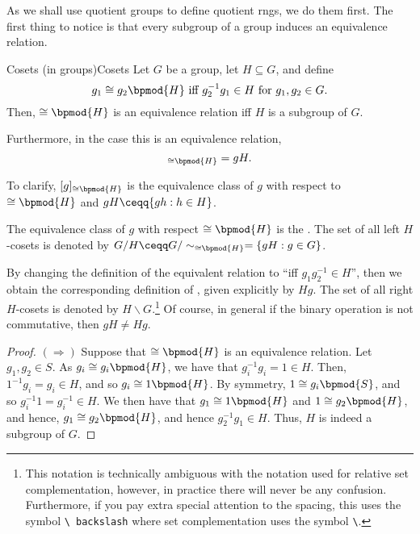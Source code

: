 As we shall use quotient groups to define quotient rngs, we do them first.  The first thing to notice is that every subgroup of a group induces an equivalence relation.
\begin{prp}{Cosets (in groups)}{Cosets}
Let $G$ be a group, let $H\subseteq G$, and define
\begin{equation}\label{eqnA.4.31}
g_1\cong g_2\bpmod{H}\text{ iff }g_2^{-1}g_1\in H\text{ for }g_1,g_2\in G.
\end{equation}
Then, $\cong \bpmod{H}$ is an equivalence relation iff $H$ is a subgroup of $G$.

Furthermore, in the case this is an equivalence relation,
\begin{equation}
[g]_{\cong \bpmod{H}}=gH.
\end{equation}
\begin{rmk}
To clarify, $[g]_{\cong \bpmod{H}}$ is the equivalence class of $g$ with respect to $\cong \bpmod{H}$ and $gH\ceqq \{ gh:h\in H\}$.
\end{rmk}
\begin{rmk}
The equivalence class of $g$ with respect $\cong \bpmod{H}$ is the .  The set of all left $H$-cosets is denoted by $G/H\ceqq G/\sim _{\cong \bpmod{H}}=\left\{ gH:g\in G\right\}$.
\end{rmk}
\begin{rmk}
By changing the definition of the equivalent relation to ``\textellipsis iff $g_1g_2^{-1}\in H$'', then we obtain the corresponding definition of , given explicitly by $Hg$.  The set of all right $H$-cosets is denoted by $H\backslash G$.\footnote{This notation is technically ambiguous with the notation used for relative set complementation, however, in practice there will never be any confusion.  Furthermore, if you pay extra special attention to the spacing, this uses the symbol \texttt{\textbackslash \ backslash} where set complementation uses the symbol \texttt{\textbackslash \setminus}.}  Of course, in general if the binary operation is not commutative, then $gH\neq Hg$.
\end{rmk}
\begin{proof}
$(\Rightarrow )$ Suppose that $\cong \bpmod{H}$ is an equivalence relation.  Let $g_1,g_2\in S$.  As $g_i\cong g_i\bpmod{H}$, we have that $g_i^{-1}g_i=1\in H$.  Then, $1^{-1}g_i=g_i\in H$, and so $g_i\cong 1\bpmod{H}$.  By symmetry, $1\cong g_i\bpmod{S}$, and so $g_i^{-1}1=g_i^{-1}\in H$.  We then have that $g_1\cong 1\bpmod{H}$ and $1\cong g_2\bpmod{H}$, and hence, $g_1\cong g_2\bpmod{H}$, and hence $g_2^{-1}g_1\in H$.  Thus, $H$ is indeed a subgroup of $G$.


\end{proof}
\end{prp}
